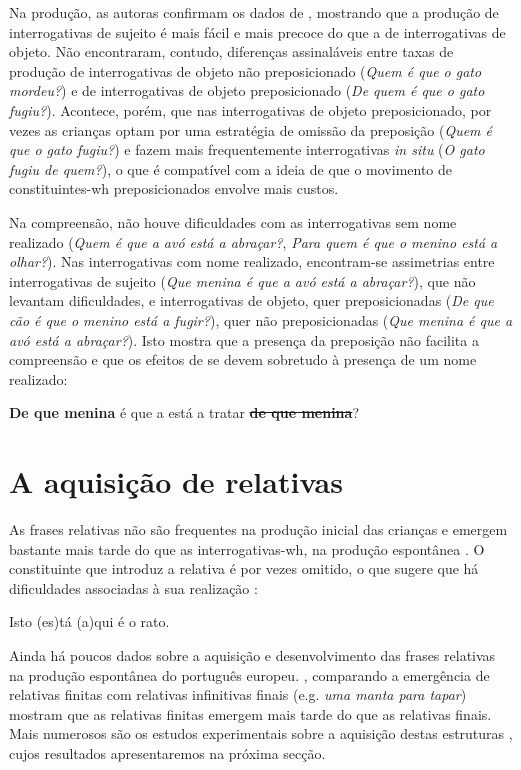 \documentclass[output=paper]{LSP/langsci}
\begin{document}
Na produção, as autoras confirmam os dados de \citet{cerejeira2010}, mostrando que a produção de interrogativas de sujeito é mais fácil e mais precoce do que a de interrogativas de objeto. Não encontraram, contudo, diferenças assinaláveis entre taxas de produção de interrogativas de objeto não preposicionado (\textit{Quem é que o gato mordeu?}) e de interrogativas de objeto preposicionado (\textit{De quem é que o gato fugiu?}). Acontece, porém, que nas interrogativas de objeto preposicionado, por vezes as crianças optam por uma estratégia de omissão da preposição (\textit{Quem é que o gato fugiu?}) e fazem mais frequentemente interrogativas \textit{in situ} (\textit{O gato fugiu de quem?}), o que é compatível com a ideia de que o movimento de constituintes-wh preposicionados envolve mais custos.

Na compreensão, não houve dificuldades com as interrogativas sem nome realizado (\textit{Quem é que a avó está a abraçar?}, \textit{Para quem é que o menino está a olhar?}). Nas interrogativas com nome realizado, encontram-se assimetrias entre interrogativas de sujeito (\textit{Que menina é que a avó está a abraçar?}), que não levantam dificuldades, e interrogativas de objeto, quer preposicionadas (\textit{De que cão é que o menino está a fugir?}), quer não preposicionadas (\textit{Que menina é que a avó está a abraçar?}). Isto mostra que a presença da preposição não facilita a compreensão e que os efeitos de  se devem sobretudo à presença de um nome realizado:

\ea\label{ex:lobo_45} \textbf{De que menina} é que a  está a tratar \sout{\textbf{de que menina}}?\z

\section{A aquisição de relativas}
\label{sec:lobo_aquisicao_rel}

As frases relativas não são frequentes na produção inicial das crianças e emergem bastante mais tarde do que as interrogativas-wh, na produção espontânea \citep{soares1998}. O constituinte que introduz a relativa é por vezes omitido, o que sugere que há dificuldades associadas à sua realização \citep{soares1998}:

\ea\label{ex:lobo_46} Isto (es)tá (a)qui é o rato.\z

Ainda há poucos dados sobre a aquisição e desenvolvimento das frases relativas na produção espontânea do português europeu. \citet{duarte_etal2011,duarte_etal2015}, comparando a emergência de relativas finitas com relativas infinitivas finais (e.g. \textit{uma manta para tapar}) mostram que as relativas finitas emergem mais tarde do que as relativas finais. Mais numerosos são os estudos experimentais sobre a aquisição destas estruturas \citep{vasconcelos1993,costa_etal2011,costa_etal2012,costa_etal2014,costa_etal2015,costasilva2014}, cujos resultados apresentaremos na próxima secção. 
\end{document}
